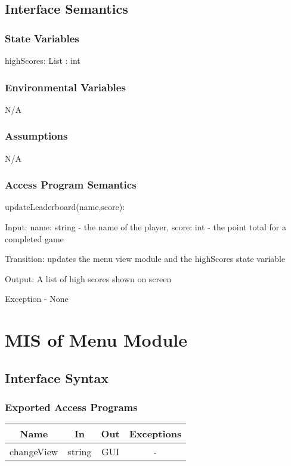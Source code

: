 \documentclass[12,english]{article}
\begin{document}
	\subsection{Interface Semantics}
		\subsubsection{State Variables}
		highScores: List : int
		
		\subsubsection{Environmental Variables}
        N/A
		\subsubsection{Assumptions}
        N/A
		\subsubsection{Access Program Semantics}

        updateLeaderboard(name,score):

		Input: name: string - the name of the player, score: int - the point total for a completed game
		
		Transition: updates the menu view module and the highScores state variable
		
		Output: A list of high scores shown on screen
		
		Exception - None\\
\section{MIS of Menu Module}
	\subsection{Interface Syntax}
		\subsubsection{Exported Access Programs}
		
	\begin{tabular}[pos]{|c|c|c|c|}
	\hline
	\textbf{Name}& \textbf{In} & \textbf{Out} & \textbf{Exceptions} \\ 
	\hline
	changeView & string & GUI & -\\ 
	\hline
	\end{tabular}		
		
\end{document}
